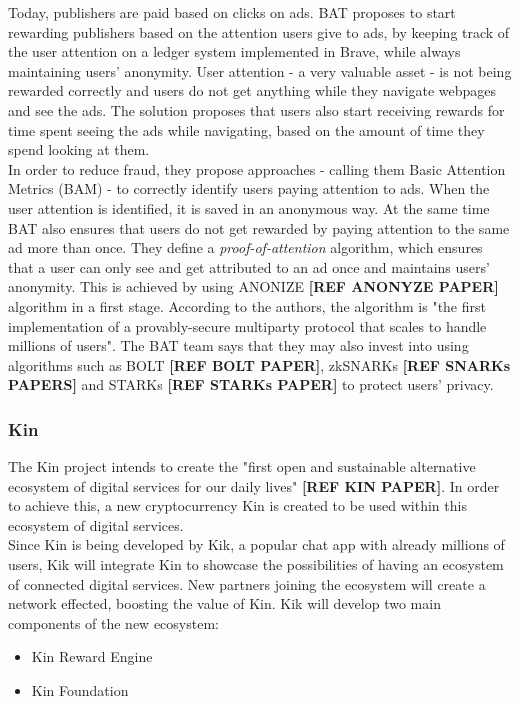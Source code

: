 
Today, publishers are paid based on clicks on ads. BAT proposes to start rewarding publishers based on the attention users give to ads, by keeping track of the user attention on a ledger system implemented in Brave, while always maintaining users' anonymity. User attention - a very valuable asset - is not being rewarded correctly and users do not get anything while they navigate webpages and see the ads. The solution proposes that users also start receiving rewards for time spent seeing the ads while navigating, based on the amount of time they spend looking at them. \\

In order to reduce fraud, they propose approaches - calling them Basic Attention Metrics (BAM) - to correctly identify users paying attention to ads. When the user attention is identified, it is saved in an anonymous way. At the same time BAT also ensures that users do not get rewarded by paying attention to the same ad more than once. They define a \textit{proof-of-attention} algorithm, which ensures that a user can only see and get attributed to an ad once and maintains users' anonymity. This is achieved by using \textsf{ANONIZE} \textbf{[REF ANONYZE PAPER]} algorithm in a first stage. According to the authors, the algorithm is "the first implementation of a provably-secure multiparty protocol that scales to handle millions of users".  The BAT team says that they may also invest into using algorithms such as BOLT \textbf{[REF BOLT PAPER]}, zkSNARKs \textbf{[REF SNARKs PAPERS]} and STARKs \textbf{[REF STARKs PAPER]} to protect users' privacy.


\subsubsection{Kin}

The Kin project intends to create the "first open and sustainable alternative ecosystem of digital services
for our daily lives" \textbf{[REF KIN PAPER]}. In order to achieve this, a new cryptocurrency Kin is created to be used within this ecosystem of digital services. \\

Since Kin is being developed by Kik, a popular chat app with already millions of users, Kik will integrate Kin to showcase the possibilities of having an ecosystem of connected digital services. New partners joining the ecosystem will create a network effected, boosting the value of Kin. Kik will develop two main components of the new ecosystem:
\begin{itemize}
	\item Kin Reward Engine
	\item Kin Foundation
\end{itemize}

